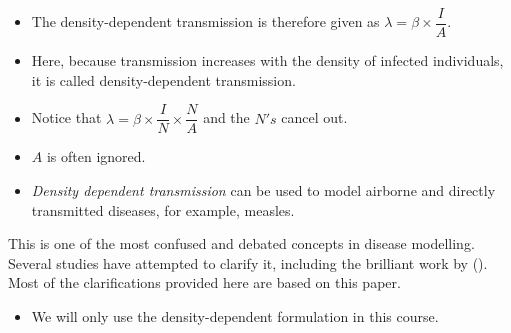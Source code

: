 \documentclass[
  ignorenonframetext,
]{beamer}
\providecommand{\tightlist}{%
  \setlength{\itemsep}{0pt}\setlength{\parskip}{0pt}}\usepackage{longtable,booktabs,array}
\begin{document}
\begin{frame}
\begin{itemize}
\item
  The density-dependent transmission is therefore given as
  {\(\lambda = \beta \times \dfrac{I}{A}\)}.
\item
  Here, because transmission increases with the density of infected
  individuals, it is called density-dependent transmission.
\end{itemize}

\begin{tcolorbox}[enhanced jigsaw, colframe=quarto-callout-note-color-frame, toprule=.15mm, opacitybacktitle=0.6, breakable, colback=white, leftrule=.75mm, left=2mm, opacityback=0, titlerule=0mm, bottomtitle=1mm, toptitle=1mm, title={Note}, bottomrule=.15mm, arc=.35mm, coltitle=black, colbacktitle=quarto-callout-note-color!10!white, rightrule=.15mm]

\begin{itemize}
\item
  Notice that
  {\(\lambda = \beta \times \dfrac{I}{N} \times \dfrac{N}{A}\)} and the
  \(N's\) cancel out.
\item
  {\(A\)} is often ignored.
\end{itemize}

\end{tcolorbox}
\end{frame}

\begin{frame}
\begin{itemize}
\tightlist
\item
  {\emph{Density dependent transmission}} can be used to model airborne
  and directly transmitted diseases, for example, measles.
\end{itemize}
\end{frame}

\begin{frame}
\begin{tcolorbox}[enhanced jigsaw, colframe=quarto-callout-caution-color-frame, toprule=.15mm, opacitybacktitle=0.6, breakable, colback=white, leftrule=.75mm, left=2mm, opacityback=0, titlerule=0mm, bottomtitle=1mm, toptitle=1mm, title={Density-dependent vs frequency dependent transmission}, bottomrule=.15mm, arc=.35mm, coltitle=black, colbacktitle=quarto-callout-caution-color!10!white, rightrule=.15mm]

This is one of the most confused and debated concepts in disease
modelling. Several studies have attempted to clarify it, including the
brilliant work by
().
Most of the clarifications provided here are based on this paper.

\end{tcolorbox}

\begin{itemize}
\tightlist
\item
  We will only use the {density-dependent} formulation in this course.
\end{itemize}
\end{frame}
\end{document}

